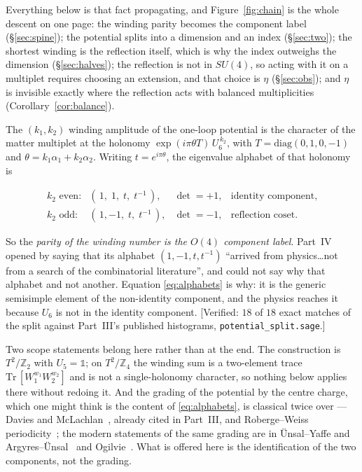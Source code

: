 \documentclass[11pt,a4paper]{article}
\newcommand{\ZZ}{\mathbb{Z}}
\newcommand{\one}{\mathds{1}}
\newcommand{\su}[1]{SU(#1)}
\newenvironment{keyeq}
  {\begin{center}\setlength{\fboxsep}{9pt}\setlength{\fboxrule}{0.8pt}%
   \begin{lrbox}{\keyeqbox}\begin{minipage}{0.88\textwidth}}
  {\end{minipage}\end{lrbox}%
   \fcolorbox{hdrblue!55}{hdrblue!6}{\usebox{\keyeqbox}}\end{center}}
\begin{document}
Everything below is that fact propagating, and Figure~\ref{fig:chain} is the whole descent on one
page: the winding parity becomes the component label
(\S\ref{sec:spine}); the potential splits into a dimension and an index (\S\ref{sec:two}); the
shortest winding is the reflection itself, which is why the index outweighs the dimension
(\S\ref{sec:halves}); the reflection is not in $\su4$, so acting with it on a multiplet requires
choosing an extension, and that choice is $\eta$ (\S\ref{sec:obs}); and $\eta$ is invisible exactly
where the reflection acts with balanced multiplicities (Corollary~\ref{cor:balance}).

The $(k_1,k_2)$ winding amplitude of the one-loop potential is the character of the matter multiplet
at the holonomy $\exp(i\pi\theta T)\,U_6^{\,k_2}$, with $T=\mathrm{diag}(0,1,0,-1)$ and
$\theta=k_1\alpha_1+k_2\alpha_2$. Writing $t=e^{i\pi\theta}$, the eigenvalue alphabet of that
holonomy is
\begin{keyeq}
\begin{equation}\label{eq:alphabets}
\begin{array}{llll}
k_2 \text{ even:} & (\,1,\;1,\;t,\;t^{-1}\,), & \det=+1, & \text{identity component},\\[2pt]
k_2 \text{ odd:} & (\,1,-1,\;t,\;t^{-1}\,), & \det=-1, & \text{reflection coset.}
\end{array}
\end{equation}
\end{keyeq}
So the \emph{parity of the winding number is the $O(4)$ component label}. Part~IV opened by saying
that its alphabet $(1,-1,t,t^{-1})$ ``arrived from physics\dots not from a search of the
combinatorial literature'', and could not say why that alphabet and not another. Equation
\eqref{eq:alphabets} is why: it is the generic semisimple element of the non-identity component, and
the physics reaches it because $U_6$ is not in the identity component. [Verified: $18$ of $18$ exact
matches of the split against Part~III's published histograms, \texttt{potential\_split.sage}.]

Two scope statements belong here rather than at the end. The construction is $T^2/\ZZ_2$ with
$U_5=\one$; on $T^2/\ZZ_4$ the winding sum is a two-element trace
$\mathrm{Tr}\,[W_1^{w_1}W_2^{w_2}]$ and is not a single-holonomy character, so nothing below applies
there without redoing it. And the grading of the potential by the centre charge, which one might
think is the content of \eqref{eq:alphabets}, is classical twice over --- Davies and
McLachlan~\cite{DM}, already cited in Part~III, and Roberge--Weiss periodicity~\cite{RW}; the
modern statements of the same grading are in \"Unsal--Yaffe and Argyres--\"Unsal~\cite{ArgyresUnsal}
and Ogilvie~\cite{Ogilvie}. What is offered here is the identification of the two components, not the
grading.
\end{document}
